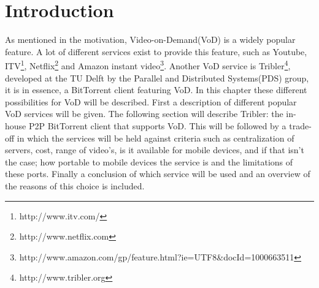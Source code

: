 \section{Introduction}
As mentioned in the motivation, Video-on-Demand(VoD) is a widely popular feature. A lot of different services exist to provide this feature, such as Youtube, ITV\footnote{http://www.itv.com/}, Netflix\footnote{http://www.netflix.com} and Amazon instant video\footnote{http://www.amazon.com/gp/feature.html?ie=UTF8\&docId=1000663511}. Another VoD service is Tribler\footnote{http://www.tribler.org}, developed at the TU Delft by the Parallel and Distributed Systems(PDS) group, it is in essence, a BitTorrent client featuring VoD. In this chapter these different possibilities for VoD will be described. First a description of different popular VoD services will be given. The following section will describe Tribler: the in-house P2P BitTorrent client that supports VoD. This will be followed by a trade-off in which the services will be held against criteria such as centralization of servers, cost, range of video's, is it available for mobile devices, and if that isn't the case; how portable to mobile devices the service is and the limitations of these ports. Finally a conclusion of which service will be used and an overview of the reasons of this choice is included.